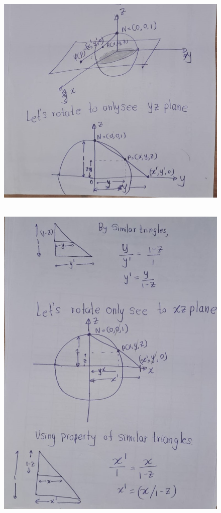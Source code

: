 \documentclass[
]{book}
\theoremstyle{definition}
\theoremstyle{definition}
\theoremstyle{definition}
\theoremstyle{definition}
\theoremstyle{remark}
\begin{document}
\begin{figure}
\centering
\includegraphics{figures/ch1/fig03.jpg}
\caption{\label{fig:fig03}\(~\)}
\end{figure}

\begin{figure}
\centering
\includegraphics{figures/ch1/fig04.jpg}
\caption{\label{fig:fig04}\(~\)}
\end{figure}
\end{document}
